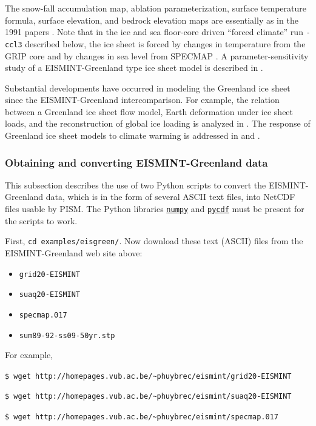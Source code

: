 \documentclass[11pt,final]{amsart}
\begin{document}
\noindent The snow-fall accumulation map, ablation parameterization, surface temperature formula, surface elevation, and bedrock elevation maps are essentially as in the 1991 papers \cite{Letreguillyetal1991,OhmuraReeh}.  Note that in the ice and sea floor-core driven ``forced climate'' run \verb|-ccl3| described below, the ice sheet is forced by changes in temperature from the GRIP core \cite{Dansgaardetal1993} and by changes in sea level from SPECMAP \cite{Imbrieetal1984}.  A parameter-sensitivity study of a EISMINT-Greenland type ice sheet model is described in \cite{RitzFabreLetreguilly}.

Substantial developments have occurred in modeling the Greenland ice sheet since the EISMINT-Greenland intercomparison.  For example, the relation between a Greenland ice sheet flow model, Earth deformation under ice sheet loads, and the reconstruction of global ice loading is analyzed in \cite{TarasovPeltier}.  The response of Greenland ice sheet models to climate warming is addressed in \cite{HuybrechtsdeWolde} and \cite{Greve00}.


\subsubsection*{Obtaining and converting EISMINT-Greenland data}  This subsection describes the use of two Python scripts to convert the EISMINT-Greenland data, which is in the form of several ASCII text files, into NetCDF files usable by PISM.  The Python libraries \href{http://numpy.scipy.org/}{\texttt{numpy}} and \href{http://pysclint.sourceforge.net/pycdf/}{\texttt{pycdf}} must be present for the scripts to work.

First, \verb|cd examples/eisgreen/|.  Now download these text (ASCII) files from the EISMINT-Greenland web site above:\begin{itemize}
 \item \verb|grid20-EISMINT|
 \item \verb|suaq20-EISMINT|
 \item \verb|specmap.017|
 \item \verb|sum89-92-ss09-50yr.stp|
\end{itemize}
For example, \small

\verb|$ wget http://homepages.vub.ac.be/~phuybrec/eismint/grid20-EISMINT|

\verb|$ wget http://homepages.vub.ac.be/~phuybrec/eismint/suaq20-EISMINT|

\verb|$ wget http://homepages.vub.ac.be/~phuybrec/eismint/specmap.017|
\end{document}
